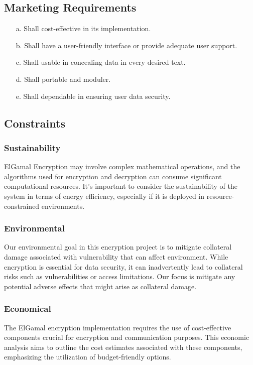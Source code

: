 \documentclass[12pt]{article}
\begin{document}
	\subsection{Marketing Requirements}
	\begin{enumerate}
		\item[a.] Shall  cost-effective in its implementation.
		\item[b.] Shall have a user-friendly interface or provide adequate user support.
		\item[c.] Shall  usable in concealing data in every desired text.
		\item[d.] Shall  portable and moduler.
		\item[e.] Shall  dependable in ensuring user data security.				
	\end{enumerate}
	\subsection{Constraints}
		\subsubsection{Sustainability}
		ElGamal Encryption may involve complex mathematical operations, and the algorithms used for encryption and decryption can consume significant computational resources. It's important to consider the sustainability of the system in terms of energy efficiency, especially if it is deployed in resource-constrained environments.
		\subsubsection{Environmental}
		Our environmental goal in this encryption project is to mitigate collateral damage associated with vulnerability that can affect environment. While encryption is essential for data security, it can inadvertently lead to collateral risks such as vulnerabilities or access limitations. Our focus is mitigate any potential adverse effects that might arise as collateral damage.
		\subsubsection{Economical}
		The ElGamal encryption implementation requires the use of cost-effective components crucial for encryption and communication purposes. This economic analysis aims to outline the cost estimates associated with these components, emphasizing the utilization of budget-friendly options.
			
\end{document}
